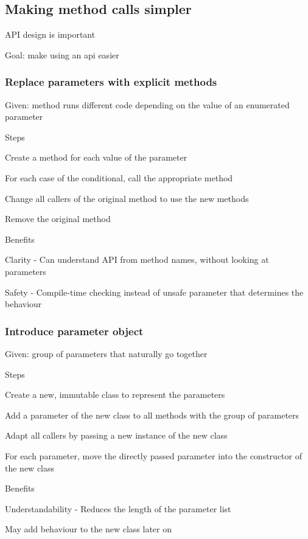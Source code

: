 \documentclass[10pt]{article}
\begin{document}
\subsection{Making method calls simpler}
\enumstart
	\item API design is important
	\item Goal: make using an api easier
\enumend

\subsubsection{Replace parameters with explicit methods}
\enumstart
	\item Given: method runs different code depending on the value of an enumerated parameter
	\item Steps
	\enumstart
		\item Create a method for each value of the parameter
		\item For each case of the conditional, call the appropriate method
		\item Change all callers of the original method to use the new methods
		\item Remove the original method
	\enumend
	\item Benefits
	\enumstart
		\item Clarity - Can understand API from method names, without looking at parameters
		\item Safety - Compile-time checking instead of unsafe parameter that determines the behaviour
	\enumend
\enumend

\subsubsection{Introduce parameter object}
\enumstart
	\item Given: group of parameters that naturally go together
	\item Steps
	\enumstart
		\item Create a new, immutable class to represent the parameters
		\item Add a parameter of the new class to all methods with the group of parameters
		\item Adapt all callers by passing a new instance of the new class
		\item For each parameter, move the directly passed parameter into the constructor of the new class
	\enumend
	\item Benefits
	\enumstart
		\item Understandability - Reduces the length of the parameter list
		\item May add behaviour to the new class later on
	\enumend
\enumend
\end{document}

